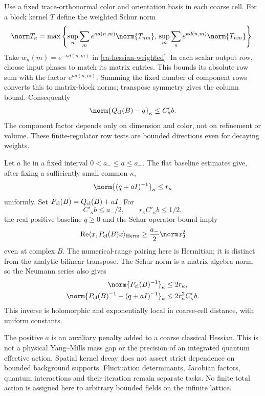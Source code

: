 Use a fixed trace-orthonormal color and orientation basis in
each coarse cell. For a block kernel $T$ define the weighted
Schur norm
\begin{equation}\label{ca-schur}
 \norm T_\kappa=\max\left\{
   \sup_n\sum_m e^{\kappa d(n,m)}\norm{T_{nm}},\,
   \sup_m\sum_n e^{\kappa d(n,m)}\norm{T_{nm}}\right\}.
\end{equation}
Take $w_n(m)=e^{-\kappa d(n,m)}$ in
\eqref{ca-hessian-weighted}. In each scalar output row,
choose input phases to match its matrix entries. This bounds
its absolute row sum with the factor $e^{\kappa d(n,m)}$.
Summing the fixed number of component rows converts this to
matrix-block norms; transpose symmetry gives the column bound.
Consequently
\begin{equation}\label{ca-hessian-schur}
 \norm{Q_{\rm cl}(B)-q}_\kappa\le C'_{\kappa}b.
\end{equation}
The component factor depends only on dimension and color,
not on refinement or volume. These finite-regulator row tests
are bounded directions even for decaying weights.

Let $a$ lie in a fixed interval $0<a_-\le a\le a_+$.
The flat baseline estimates give, after fixing a sufficiently
small common $\kappa$,
\begin{equation}\label{ca-baseline-inverse}
 \norm{(q+aI)^{-1}}_\kappa\le r_\kappa
\end{equation}
uniformly. Set $P_{\rm cl}(B)=Q_{\rm cl}(B)+aI$.
For
\begin{equation}\label{ca-inverse-radius}
 C'_\kappa b\le a_-/2,\qquad
 r_\kappa C'_\kappa b\le1/2,
\end{equation}
the real positive baseline $q\ge0$ and the Schur operator
bound imply
\begin{equation}\label{ca-accretivity}
 \operatorname{Re}\langle x,P_{\rm cl}(B)x\rangle_{\rm Herm}
                 \ge\frac{a_-}{2}\norm x_2^2
\end{equation}
even at complex $B$. The numerical-range pairing here is
Hermitian; it is distinct from the analytic bilinear transpose.
The Schur norm is a matrix algebra norm, so the Neumann series
also gives
\begin{equation}\label{ca-inverse-bounds}
 \begin{split}
 \norm{P_{\rm cl}(B)^{-1}}_\kappa&\le2r_\kappa,\\
 \norm{P_{\rm cl}(B)^{-1}-(q+aI)^{-1}}_\kappa
                         &\le2r_\kappa^2C'_\kappa b.
 \end{split}
\end{equation}
This inverse is holomorphic and exponentially local in
coarse-cell distance, with uniform constants.

The positive $a$ is an auxiliary penalty added to a coarse
classical Hessian. This is not a physical Yang--Mills mass gap
or the precision of an integrated quantum effective action.
Spatial kernel decay does not assert strict dependence on
bounded background supports. Fluctuation determinants,
Jacobian factors, quantum interactions and their iteration
remain separate tasks. No finite total action is assigned
here to arbitrary bounded fields on the infinite lattice.
